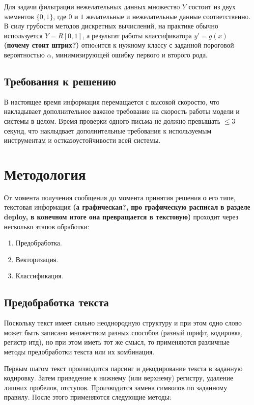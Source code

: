 \documentclass[12pt]{article}
\begin{document}
Для задачи фильтрации нежелательных данных множество $Y$ состоит из двух элементов $\{0, 1\}$, где $0$ и $1$ желательные и нежелательные данные соответственно. В силу грубости методов дискретных вычислений, на практике обычно используется $Y = R[0, 1]$, а результат работы классификатора $y' = g(x)$ {\bf\color{amaranth} (почему стоит штрих?)} отноcится к нужному классу с заданной пороговой вероятностью $\alpha$, минимизирующей ошибку первого и второго рода.

\subsection{Требования к решению}
В настоящее время информация перемащается с высокой скоростю, что накладывает дополнительное важное требование на скорость работы модели и системы в целом. Время проверки одного письма не должно превышать $\leqslant 3$ секунд, что наклыдвает дополнительные требования к используемым инструментам и остказоустойчивости всей системы. 

\section{Методология}

От момента получения сообщения до момента принятия решения о его типе, текстовая информация {\bf\color{amaranth} (а графическая?, про графическую расписал в разделе deploy, в конечном итоге она превращается в текстовую)} проходит через несколько этапов обработки:
\begin{enumerate}
\item Предобработка.
\item Векторизация.
\item Классификация.
\end{enumerate}

\subsection{Предобработка текста}
Поскольку текст имеет сильно неоднородную структуру и при этом одно слово может быть записано множеством разных способов (разный шрифт, кодировка, регистр итд), но при этом иметь тот же смысл, то применяются различные методы предобработки текста или их комбинация.

Первым шагом текст производится парсинг и декодирование текста в заданную кодировку. Затем приведение к нижнему (или верхнему) регистру, удаление лишних пробелов, отступов. Производится замена символов по заданному правилу. После этого применяются следующие методы:
\end{document}
